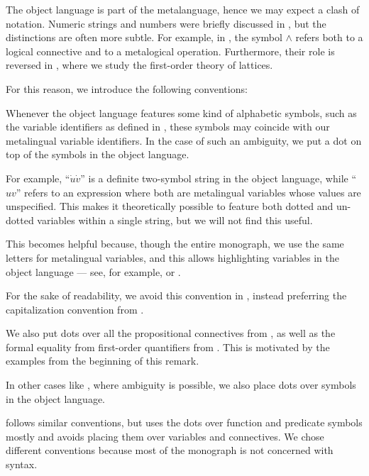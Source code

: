 \begin{remark}\label{rem:object_language_dots}
  The object language is part of the metalanguage, hence we may expect a clash of notation. Numeric strings and numbers were briefly discussed in , but the distinctions are often more subtle. For example, in , the symbol \( \wedge \) refers both to a logical connective and to a metalogical operation. Furthermore, their role is reversed in , where we study the first-order theory of lattices.

  For this reason, we introduce the following conventions:
  \begin{thmenum}
     Whenever the object language features some kind of alphabetic symbols, such as the variable identifiers as defined in , these symbols may coincide with our metalingual variable identifiers. In the case of such an ambiguity, we put a dot on top of the symbols in the object language.

    For example, \enquote{\( \dot u \dot v \)} is a definite two-symbol string in the object language, while \enquote{\( uv \)} refers to an expression where both are metalingual variables whose values are unspecified. This makes it theoretically possible to feature both dotted and un-dotted variables within a single string, but we will not find this useful.

    This becomes helpful because, though the entire monograph, we use the same letters for metalingual variables, and this allows highlighting variables in the object language --- see, for example,  or .

    For the sake of readability, we avoid this convention in , instead preferring the capitalization convention from .

     We also put dots over all the propositional connectives from , as well as the formal equality from first-order quantifiers from . This is motivated by the examples from the beginning of this remark.

     In other cases like , where ambiguity is possible, we also place dots over symbols in the object language.
  \end{thmenum}

   follows similar conventions, but uses the dots over function and predicate symbols mostly and avoids placing them over variables and connectives. We chose different conventions because most of the monograph is not concerned with syntax.
\end{remark}
